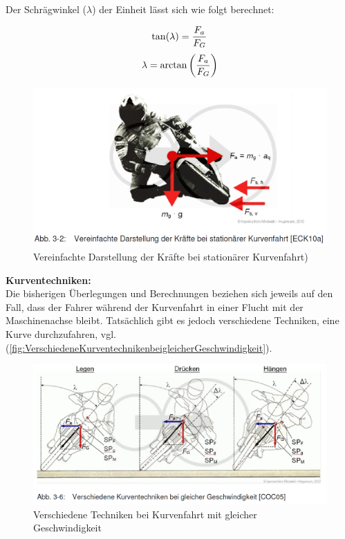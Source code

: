 Der Schrägwinkel ($\lambda$) der Einheit lässt sich wie folgt berechnet:


\begin{align*}
	\centering
	\tan(\lambda)  =  \frac{F_a}{F_G}
\end{align*}
\begin{align}
	\centering
	\lambda  =  \arctan \left(\frac{F_a}{F_G}\right)
	\label{gl:Schraegwinkel}
\end{align}


\begin{figure}[H]
	\centering
	\includegraphics[width=\linewidth]{Bilder/VereinfachteDarstellungDerKraefteBeiStationaererKurvenfahrt.png}
	\caption{Vereinfachte Darstellung der Kräfte bei stationärer Kurvenfahrt)}
	\label{fig:VereinfachteDarstellungDerKraefteBeiStationaererKurvenfahrt}
\end{figure}


\textbf{Kurventechniken:}\\
Die bisherigen Überlegungen und Berechnungen beziehen sich jeweils auf den Fall, dass der Fahrer während der Kurvenfahrt in einer Flucht mit der Maschinenachse bleibt. Tatsächlich gibt es jedoch verschiedene Techniken, eine Kurve durchzufahren, vgl. (\autoref{fig:VerschiedeneKurventechnikenbeigleicherGeschwindigkeit}).
\begin{figure}
	\centering
	\includegraphics[width=\linewidth]{Bilder/VerschiedeneKurventechnikenbeigleicherGeschwindigkeit.png}
	\caption{Verschiedene Techniken bei Kurvenfahrt mit gleicher Geschwindigkeit}
	\label{fig:VerschiedeneKurventechnikenbeigleicherGeschwindigkeit}
\end{figure}

